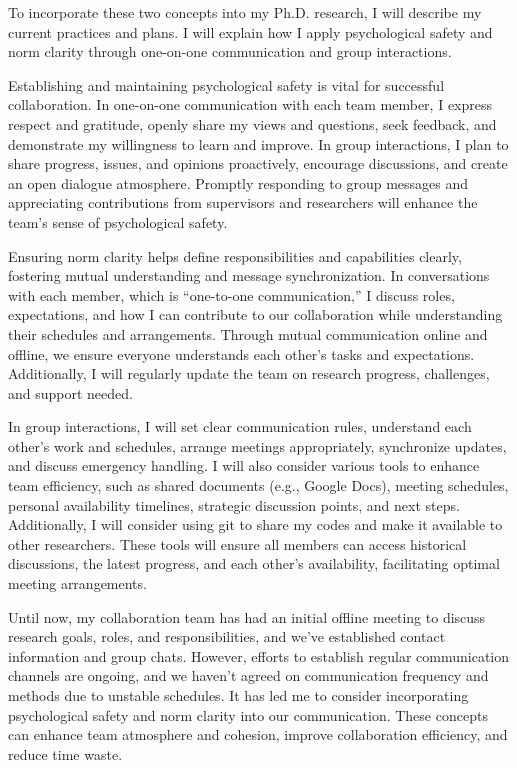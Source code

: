 \documentclass[11pt]{report}
\begin{document}
To incorporate these two concepts into my Ph.D. research, I will describe my current practices and plans. I will explain how I apply psychological safety and norm clarity through one-on-one communication and group interactions.

Establishing and maintaining psychological safety is vital for successful collaboration. In one-on-one communication with each team member, I express respect and gratitude, openly share my views and questions, seek feedback, and demonstrate my willingness to learn and improve. In group interactions, I plan to share progress, issues, and opinions proactively, encourage discussions, and create an open dialogue atmosphere. Promptly responding to group messages and appreciating contributions from supervisors and researchers will enhance the team's sense of psychological safety.

Ensuring norm clarity helps define responsibilities and capabilities clearly, fostering mutual understanding and message synchronization. In conversations with each member, which is ``one-to-one communication,'' I discuss roles, expectations, and how I can contribute to our collaboration while understanding their schedules and arrangements. Through mutual communication online and offline, we ensure everyone understands each other's tasks and expectations. Additionally, I will regularly update the team on research progress, challenges, and support needed.

In group interactions, I will set clear communication rules, understand each other's work and schedules, arrange meetings appropriately, synchronize updates, and discuss emergency handling. I will also consider various tools to enhance team efficiency, such as shared documents (e.g., Google Docs), meeting schedules, personal availability timelines, strategic discussion points, and next steps. Additionally, I will consider using git to share my codes and make it available to other researchers. These tools will ensure all members can access historical discussions, the latest progress, and each other's availability, facilitating optimal meeting arrangements.

Until now, my collaboration team has had an initial offline meeting to discuss research goals, roles, and responsibilities, and we've established contact information and group chats. However, efforts to establish regular communication channels are ongoing, and we haven't agreed on communication frequency and methods due to unstable schedules. It has led me to consider incorporating psychological safety and norm clarity into our communication. These concepts can enhance team atmosphere and cohesion, improve collaboration efficiency, and reduce time waste.
\end{document}
